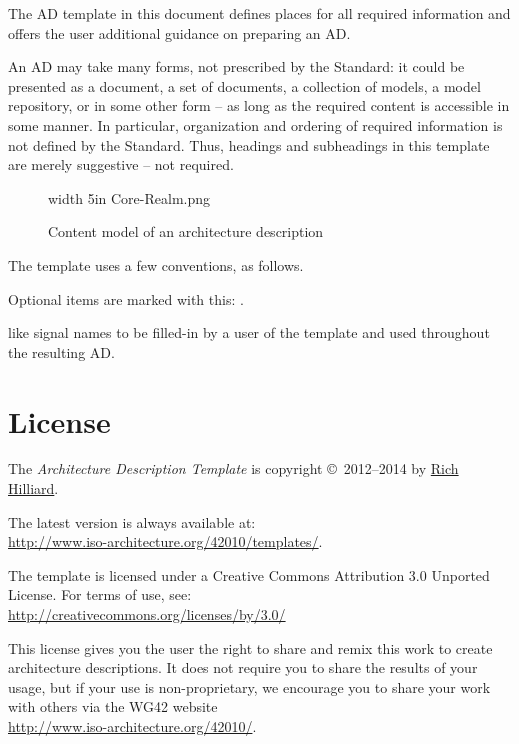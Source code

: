 \documentclass[10pt,oneside]{report}
\begin{document}
The AD template in this document defines places for all required
information and offers the user additional guidance on preparing an
AD.

An AD may take many forms, not prescribed by the Standard: it could be
presented as a document, a set of documents, a collection of models, a
model repository, or in some other form -- as long as the required
content is accessible in some manner. In particular, organization and
ordering of required information is not defined by the Standard.
Thus, headings and subheadings in this template are merely suggestive
-- not required.

\begin{figure}[!h]
\pdfimage width 5in {Core-Realm.png}
\caption{Content model of an architecture description}\label{fig:content}
\end{figure}
 
The template uses a few conventions, as follows.



Optional items are marked with this: \Optional.

 like  signal names to be filled-in by a
user of the template and used throughout the resulting AD.




\section*{License}

The \textit{Architecture Description Template} is copyright
\copyright\ 2012--2014 by
\href{http://www.iso-architecture.org/42010/templates/}%
{Rich Hilliard}.

The latest version is always available at: \\
\url{http://www.iso-architecture.org/42010/templates/}.

The template is licensed under a Creative Commons Attribution 3.0
Unported License. For terms of use, see:\\
\url{http://creativecommons.org/licenses/by/3.0/}

\vfill {}

This license gives you the user the right to share and remix this work
to create architecture descriptions.  It does not require you to share
the results of your usage, but if your use is non-proprietary, we
encourage you to share your work with others via the WG42 website \\
\url{http://www.iso-architecture.org/42010/}.
\end{document}
